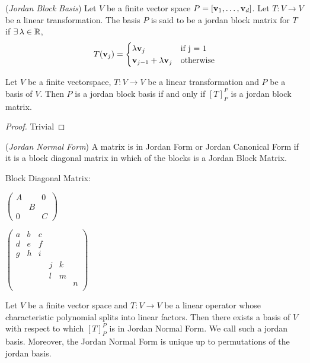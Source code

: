 \documentclass{article}
\begin{document}
\begin{ndefi}{(\textit{Jordan Block Basis})}
  Let $V$ be a finite vector space $P = [\boldsymbol{\mathbf{v}}_1, \dots, \boldsymbol{\mathbf{v}}_d]$. Let $T: V \to V$ be a linear transformation. The basis $P$ is said to be a jordan block matrix for $T$ if $\exists\, \lambda \in \mathbb{R}$,
  $$ T(\boldsymbol{\mathbf{v}}_j) = \begin{cases}
    \lambda\boldsymbol{\mathbf{v}}_j & \text{if j = 1}\\
    \boldsymbol{\mathbf{v}}_{j-1}+\lambda\boldsymbol{\mathbf{v}}_j & \text{otherwise}
  \end{cases} $$
\end{ndefi}

\begin{ncor}
  Let $V$ be a finite vectorspace, $T : V \to V$ be a linear transformation and $P$ be a basis of $V$. Then $P$ is a jordan block basis if and only if $[T]_P^P$ is a jordan block matrix.
\end{ncor}
\begin{proof}
  Trivial
\end{proof}

\begin{ndefi}{(\textit{Jordan Normal Form})}
  A matrix is in Jordan Form or Jordan Canonical Form if it is a block diagonal matrix in which of the blocks is a Jordan Block Matrix.
\end{ndefi}

Block Diagonal Matrix:\hspace{50pt}
\begin{minipage}{0.3\textwidth}
  $\begin{pmatrix}
    A & & 0 \\
    & B &   \\
    0 & & C
  \end{pmatrix}$
\end{minipage}\begin{minipage}{0.3\textwidth}
  $\begin{pmatrix}
    a & b & c & & &  \\
    d & e & f &  & & \\
    g & h & i &  & & \\
     &  &  & j & k & \\
     &  &  & l & m & \\
     &  &  &  &  & n \\
  \end{pmatrix}$
\end{minipage}

\begin{nthm}
  Let $V$ be a finite vector space and $T : V \to V$ be a linear operator whose characteristic polynomial splits into linear factors. Then there exists a basis of $V$ with respect to which $[T]_P^P$ is in Jordan Normal Form. We call such a jordan basis. Moreover, the Jordan Normal Form is unique up to permutations of the jordan basis.
\end{nthm}
\end{document}
